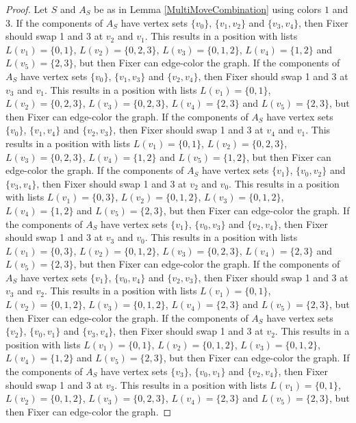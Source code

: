 \documentclass[12pt]{amsart}
\theoremstyle{plain}
\theoremstyle{definition}
\theoremstyle{remark}
\begin{document}
\begin{proof}
Let $S$ and $A_S$ be as in Lemma \ref{MultiMoveCombination} using colors $1$ and $3$. If the components of $A_S$ have vertex sets $\{v_0\}$, $\{v_1, v_2\}$ and $\{v_3, v_4\}$, then Fixer should swap 1 and 3 at $v_2$ and $v_1$. This results in a position with lists $L(v_1) = \{0, 1\}$, $L(v_2) = \{0, 2, 3\}$, $L(v_3) = \{0, 1, 2\}$, $L(v_4) = \{1, 2\}$ and $L(v_5) = \{2, 3\}$, but then Fixer can edge-color the graph.
If the components of $A_S$ have vertex sets $\{v_0\}$, $\{v_1, v_3\}$ and $\{v_2, v_4\}$, then Fixer should swap 1 and 3 at $v_3$ and $v_1$. This results in a position with lists $L(v_1) = \{0, 1\}$, $L(v_2) = \{0, 2, 3\}$, $L(v_3) = \{0, 2, 3\}$, $L(v_4) = \{2, 3\}$ and $L(v_5) = \{2, 3\}$, but then Fixer can edge-color the graph.
If the components of $A_S$ have vertex sets $\{v_0\}$, $\{v_1, v_4\}$ and $\{v_2, v_3\}$, then Fixer should swap 1 and 3 at $v_4$ and $v_1$. This results in a position with lists $L(v_1) = \{0, 1\}$, $L(v_2) = \{0, 2, 3\}$, $L(v_3) = \{0, 2, 3\}$, $L(v_4) = \{1, 2\}$ and $L(v_5) = \{1, 2\}$, but then Fixer can edge-color the graph.
If the components of $A_S$ have vertex sets $\{v_1\}$, $\{v_0, v_2\}$ and $\{v_3, v_4\}$, then Fixer should swap 1 and 3 at $v_2$ and $v_0$. This results in a position with lists $L(v_1) = \{0, 3\}$, $L(v_2) = \{0, 1, 2\}$, $L(v_3) = \{0, 1, 2\}$, $L(v_4) = \{1, 2\}$ and $L(v_5) = \{2, 3\}$, but then Fixer can edge-color the graph.
If the components of $A_S$ have vertex sets $\{v_1\}$, $\{v_0, v_3\}$ and $\{v_2, v_4\}$, then Fixer should swap 1 and 3 at $v_3$ and $v_0$. This results in a position with lists $L(v_1) = \{0, 3\}$, $L(v_2) = \{0, 1, 2\}$, $L(v_3) = \{0, 2, 3\}$, $L(v_4) = \{2, 3\}$ and $L(v_5) = \{2, 3\}$, but then Fixer can edge-color the graph.
If the components of $A_S$ have vertex sets $\{v_1\}$, $\{v_0, v_4\}$ and $\{v_2, v_3\}$, then Fixer should swap 1 and 3 at $v_3$ and $v_2$. This results in a position with lists $L(v_1) = \{0, 1\}$, $L(v_2) = \{0, 1, 2\}$, $L(v_3) = \{0, 1, 2\}$, $L(v_4) = \{2, 3\}$ and $L(v_5) = \{2, 3\}$, but then Fixer can edge-color the graph.
If the components of $A_S$ have vertex sets $\{v_2\}$, $\{v_0, v_1\}$ and $\{v_3, v_4\}$, then Fixer should swap 1 and 3 at $v_2$. This results in a position with lists $L(v_1) = \{0, 1\}$, $L(v_2) = \{0, 1, 2\}$, $L(v_3) = \{0, 1, 2\}$, $L(v_4) = \{1, 2\}$ and $L(v_5) = \{2, 3\}$, but then Fixer can edge-color the graph.
If the components of $A_S$ have vertex sets $\{v_3\}$, $\{v_0, v_1\}$ and $\{v_2, v_4\}$, then Fixer should swap 1 and 3 at $v_3$. This results in a position with lists $L(v_1) = \{0, 1\}$, $L(v_2) = \{0, 1, 2\}$, $L(v_3) = \{0, 2, 3\}$, $L(v_4) = \{2, 3\}$ and $L(v_5) = \{2, 3\}$, but then Fixer can edge-color the graph.

\end{proof}
\end{document}
